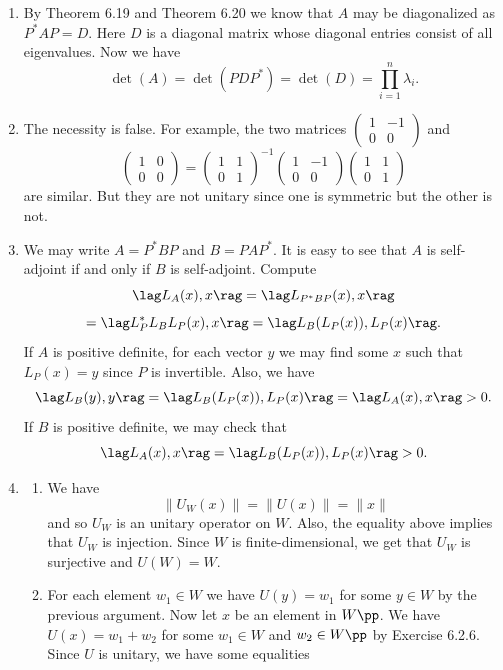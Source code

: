 \begin{enumerate}
So the matrix could be 
\[\begin{pmatrix}\frac{1}{3}&\frac{2}{3}&\frac{2}{3}\\-\frac{2}{3\sqrt{5}}&\frac{5}{3\sqrt{5}}&-\frac{{2}^{2}}{3\sqrt{5}}\\-\frac{2}{\sqrt{5}}&0&\frac{1}{\sqrt{5}}\end{pmatrix}.\]
\item By Theorem 6.19 and Theorem 6.20 we know that $A$ may be diagonalized as $P^*AP=D$. Here $D$ is a diagonal matrix whose diagonal entries consist of all eigenvalues. Now we have 
\[\det(A)=\det(PDP^*)=\det(D)=\prod_{i=1}^n{\lambda_i}.\]
\item The necessity is false. For example, the two matrices $\begin{pmatrix}1&-1\\0&0\end{pmatrix}$ and 
\[\begin{pmatrix}1&0\\0&0\end{pmatrix}=\begin{pmatrix}1&1\\0&1\end{pmatrix}^{-1}\begin{pmatrix}1&-1\\0&0\end{pmatrix}\begin{pmatrix}1&1\\0&1\end{pmatrix}\]
are similar. But they are not unitary since one is symmetric but the other is not.
\item We may write $A=P^*BP$ and $B = PAP^*$.  It is easy to see that $A$ is self-adjoint if and only if $B$ is self-adjoint.  Compute 
\[\lag L_A(x),x\rag =\lag L_{P^*BP}(x),x\rag \]
\[=\lag L_{P}^*L_BL_P(x),x\rag =\lag L_B(L_P(x)),L_P(x)\rag .\]
If $A$ is positive definite, for each vector $y$ we may find some $x$ such that $L_P(x)=y$ since $P$ is invertible. Also, we have 
\[\lag L_B(y),y\rag =\lag L_B(L_P(x)),L_P(x)\rag =\lag L_A(x),x\rag >0.\]
If $B$ is positive definite, we may check that 
\[\lag L_A(x),x\rag = \lag L_B(L_P(x)),L_P(x)\rag >0.\]
\item \begin{enumerate}
\item We have 
\[\|U_W(x)\|=\|U(x)\|=\|x\|\]
and so $U_W$ is an unitary operator on $W$. Also, the equality above implies that $U_W$ is injection. Since $W$ is finite-dimensional, we get that $U_W$ is surjective and $U(W)=W$.
\item For each element $w_1\in W$ we have $U(y)=w_1$ for some $y\in W$ by the previous argument. Now let $x$ be an element in $W\pp$. We have $U(x)=w_1+w_2$ for some $w_1\in W$ and $w_2\in W\pp$ by Exercise 6.2.6. Since $U$ is unitary, we have some equalities 

\end{enumerate}
\end{enumerate}
